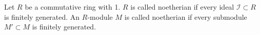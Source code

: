 Let $R$ be a commutative ring with 1. $R$ is called noetherian if every ideal $\mathcal{I} \subset R$ is finitely generated. An $R$-module $M$ is called noetherian if every submodule $M' \subset M$ is finitely generated.
